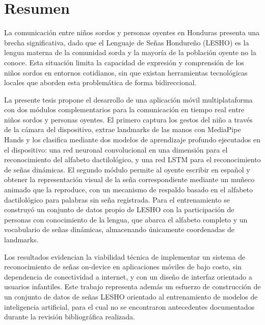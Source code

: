 \thispagestyle{plain}
\chapter*{Resumen}

La comunicación entre niños sordos y personas oyentes en Honduras presenta una brecha significativa, dado que el Lenguaje de Señas Hondureño (LESHO) es la lengua materna de la comunidad sorda y la mayoría de la población oyente no la conoce. Esta situación limita la capacidad de expresión y comprensión de los niños sordos en entornos cotidianos, sin que existan herramientas tecnológicas locales que aborden esta problemática de forma bidireccional.

La presente tesis propone el desarrollo de una aplicación móvil multiplataforma con dos módulos complementarios para la comunicación en tiempo real entre niños sordos y personas oyentes. El primero captura los gestos del niño a través de la cámara del dispositivo, extrae landmarks de las manos con MediaPipe Hands y los clasifica mediante dos modelos de aprendizaje profundo ejecutados en el dispositivo: una red neuronal convolucional en una dimensión para el reconocimiento del alfabeto dactilológico, y una red LSTM para el reconocimiento de señas dinámicas. El segundo módulo permite al oyente escribir en español y obtener la representación visual de la seña correspondiente mediante un muñeco animado que la reproduce, con un mecanismo de respaldo basado en el alfabeto dactilológico para palabras sin seña registrada. Para el entrenamiento se construyó un conjunto de datos propio de LESHO con la participación de personas con conocimiento de la lengua, que abarca el alfabeto completo y un vocabulario de señas dinámicas, almacenando únicamente coordenadas de landmarks.

Los resultados evidencian la viabilidad técnica de implementar un sistema de reconocimiento de señas on-device en aplicaciones móviles de bajo costo, sin dependencia de conectividad a internet, y con un diseño de interfaz orientado a usuarios infantiles. Este trabajo representa además un esfuerzo de construcción de un conjunto de datos de señas LESHO orientado al entrenamiento de modelos de inteligencia artificial, para el cual no se encontraron antecedentes documentados durante la revisión bibliográfica realizada.


